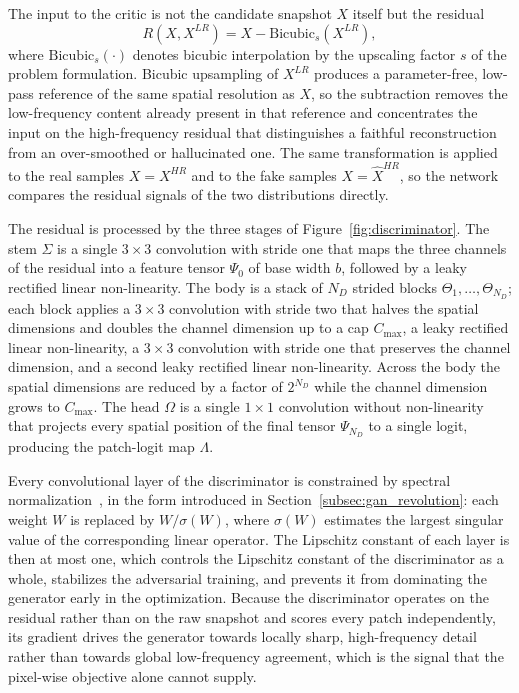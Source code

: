The input to the critic is not the candidate snapshot $X$ itself but the residual
\begin{equation}
    R(X, X^{LR}) = X - \mathrm{Bicubic}_{s}(X^{LR}),
    \label{eq:disc_residual}
\end{equation}
where $\mathrm{Bicubic}_{s}(\cdot)$ denotes bicubic interpolation by the upscaling factor $s$ of the problem formulation. Bicubic upsampling of $X^{LR}$ produces a parameter-free, low-pass reference of the same spatial resolution as $X$, so the subtraction removes the low-frequency content already present in that reference and concentrates the input on the high-frequency residual that distinguishes a faithful reconstruction from an over-smoothed or hallucinated one. The same transformation is applied to the real samples $X = X^{HR}$ and to the fake samples $X = \widehat{X}^{HR}$, so the network compares the residual signals of the two distributions directly.

The residual is processed by the three stages of Figure~\ref{fig:discriminator}. The stem $\Sigma$ is a single $3 \times 3$ convolution with stride one that maps the three channels of the residual into a feature tensor $\Psi_0$ of base width $b$, followed by a leaky rectified linear non-linearity. The body is a stack of $N_D$ strided blocks $\Theta_1, \dots, \Theta_{N_D}$; each block applies a $3 \times 3$ convolution with stride two that halves the spatial dimensions and doubles the channel dimension up to a cap $C_{\max}$, a leaky rectified linear non-linearity, a $3 \times 3$ convolution with stride one that preserves the channel dimension, and a second leaky rectified linear non-linearity. Across the body the spatial dimensions are reduced by a factor of $2^{N_D}$ while the channel dimension grows to $C_{\max}$. The head $\Omega$ is a single $1 \times 1$ convolution without non-linearity that projects every spatial position of the final tensor $\Psi_{N_D}$ to a single logit, producing the patch-logit map $\Lambda$.

Every convolutional layer of the discriminator is constrained by spectral normalization~\cite{miyato2018spectral}, in the form introduced in Section~\ref{subsec:gan_revolution}: each weight $W$ is replaced by $W / \sigma(W)$, where $\sigma(W)$ estimates the largest singular value of the corresponding linear operator. The Lipschitz constant of each layer is then at most one, which controls the Lipschitz constant of the discriminator as a whole, stabilizes the adversarial training, and prevents it from dominating the generator early in the optimization. Because the discriminator operates on the residual rather than on the raw snapshot and scores every patch independently, its gradient drives the generator towards locally sharp, high-frequency detail rather than towards global low-frequency agreement, which is the signal that the pixel-wise objective alone cannot supply.


